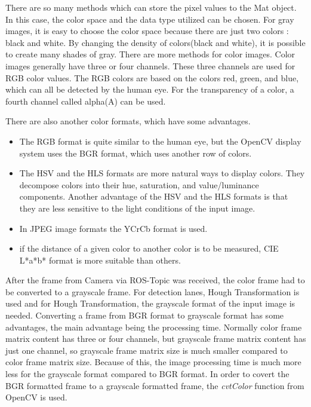 There are so many methods which can store the pixel values to the Mat object. In this case, the color space and the data type utilized can be chosen. For gray images, it is easy to choose the color space because there are just two colors : black and white. By changing the density of colors(black and white), it is possible to create many shades of gray. There are more methods for color images. Color images generally have three or four channels. These three channels are used for RGB color values. The RGB colors are based on the colors red, green, and blue, which can all be detected by the human eye. For the transparency of a color, a fourth channel called alpha(A) can be used.

There are also another color formats, which have some advantages\cite{OpenCV_Mat}. 

\begin{itemize}

\item The RGB format is quite similar to the human eye, but the OpenCV display system uses the BGR format, which uses another row of colors.  

\item The HSV and the HLS formats are more natural ways to display colors. They decompose colors into their hue, saturation, and value/luminance components. Another advantage of the HSV and the HLS formats is that they are less sensitive to the light conditions of the input image.

\item In JPEG image formats the YCrCb format is used.

\item if the distance of a given color to another color is to be measured, CIE L*a*b* format is more suitable than others.

\end{itemize}

After the frame from Camera via ROS-Topic was received, the color frame had to be converted to a grayscale frame. For detection lanes, Hough Transformation is used and for Hough Transformation, the grayscale format of the input image is needed. Converting a frame from BGR format to grayscale format has some advantages, the main advantage being the processing time. Normally color frame matrix content has three or four channels, but grayscale frame matrix content has just one channel, so grayscale frame matrix size is much smaller compared to color frame matrix size. Because of this, the image processing time is much more less for the grayscale format compared to BGR format. In order to covert the BGR formatted frame to a grayscale formatted frame, the \textit{cvtColor} function from OpenCV is used.

